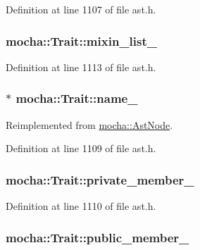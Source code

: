 Definition at line 1107 of file ast.h.

\hypertarget{classmocha_1_1_trait_a4278204db437fafcc990bea0f7273988}{
\subsubsection[{mixin\_\-list\_\-}]{ {\bf mocha::Trait::mixin\_\-list\_\-}}}
\label{classmocha_1_1_trait_a4278204db437fafcc990bea0f7273988}


Definition at line 1113 of file ast.h.

\hypertarget{classmocha_1_1_trait_ae5c62637bd661cf4b74b4f57defb2cca}{
\subsubsection[{name\_\-}]{$\ast$ {\bf mocha::Trait::name\_\-}}}
\label{classmocha_1_1_trait_ae5c62637bd661cf4b74b4f57defb2cca}


Reimplemented from \hyperlink{classmocha_1_1_ast_node_a876b49852a3151d977c842a90ee02771}{mocha::AstNode}.



Definition at line 1109 of file ast.h.

\hypertarget{classmocha_1_1_trait_aa98d22f8488f3cfde37292d9426869b8}{
\subsubsection[{private\_\-member\_\-}]{ {\bf mocha::Trait::private\_\-member\_\-}}}
\label{classmocha_1_1_trait_aa98d22f8488f3cfde37292d9426869b8}


Definition at line 1110 of file ast.h.

\hypertarget{classmocha_1_1_trait_a628920b9705cb4df54b997a991576e4e}{
\subsubsection[{public\_\-member\_\-}]{ {\bf mocha::Trait::public\_\-member\_\-}}}
\label{classmocha_1_1_trait_a628920b9705cb4df54b997a991576e4e}


